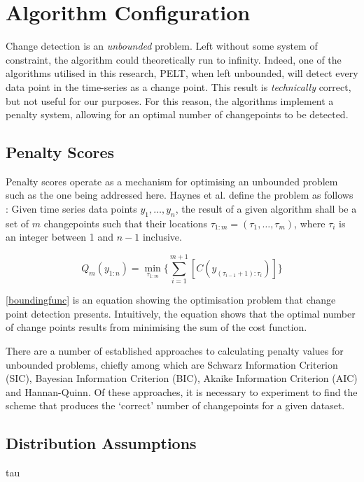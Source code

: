 \documentclass{uvamscse}	%
\begin{document}
\section{Algorithm Configuration}

Change detection is an \emph{unbounded} problem. Left without some system of constraint, the algorithm could theoretically run to infinity. Indeed, one of the algorithms utilised in this research, PELT, when left unbounded, will detect every data point in the time-series as a change point. This result is \textit{technically} correct, but not useful for our purposes. For this reason, the algorithms implement a penalty system, allowing for an optimal number of changepoints to be detected.

\subsection{Penalty Scores}

Penalty scores operate as a mechanism for optimising an unbounded problem such as the one being addressed here. Haynes et al. define the problem as follows \cite{Haynes2014}: Given time series data points $y_1,\ldots,y_n$, the result of a given algorithm shall be a set of $m$ changepoints such that their locations $\tau_{1:m} = (\tau_1,\ldots,\tau_m)$, where $\tau_i$ is an integer between 1 and $n-1$ inclusive.

\begin{equation}
\label{boundingfunc}
    Q_m(y_{1:n}) = \min_{\tau_{1:m}} \Bigg\{ \sum^{m+1}_{i=1}[C(y_{(\tau_{i - 1} + 1):\tau_i})] \Bigg\}
\end{equation}

\autoref{boundingfunc} is an equation showing the optimisation problem that change point detection presents. Intuitively, the equation shows that the optimal number of change points results from minimising the sum of the cost function.

There are a number of established approaches to calculating penalty values for unbounded problems, chiefly among which are Schwarz Information Criterion (SIC), Bayesian Information Criterion (BIC), Akaike Information Criterion (AIC) and Hannan-Quinn. Of these approaches, it is necessary to experiment to find the scheme that produces the `correct' number of changepoints for a given dataset.

\subsection{Distribution Assumptions}tau
\end{document}

